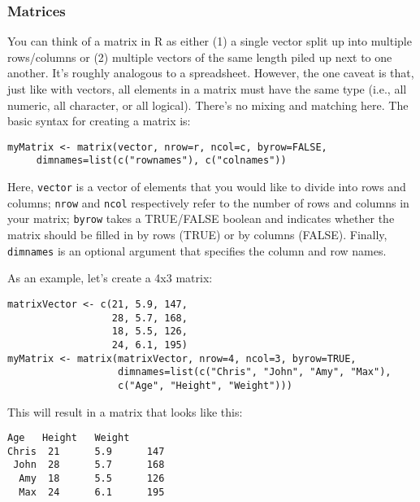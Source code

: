 \subsubsection{Matrices}
You can think of a matrix in R as either (1) a single vector split up into multiple rows/columns or (2) multiple vectors of the same length piled up next to one another. It's roughly analogous to a spreadsheet. However, the one caveat is that, just like with vectors, all elements in a matrix must have the same type (i.e., all numeric, all character, or all logical). There's no mixing and matching here. The basic syntax for creating a matrix is:

\begin{framed}
\begin{Verbatim}[samepage=TRUE]
myMatrix <- matrix(vector, nrow=r, ncol=c, byrow=FALSE, 
     dimnames=list(c("rownames"), c("colnames"))
\end{Verbatim}
\end{framed}

Here, \verb|vector| is a vector of elements that you would like to divide into rows and columns; \verb|nrow| and \verb|ncol| respectively refer to the number of rows and columns in your matrix; \verb|byrow| takes a TRUE/FALSE boolean and indicates whether the matrix should be filled in by rows (TRUE) or by columns (FALSE). Finally, \verb|dimnames| is an optional argument that specifies the column and row names.

As an example, let's create a 4x3 matrix:

\begin{framed}
\begin{Verbatim}[samepage=TRUE]
matrixVector <- c(21, 5.9, 147,
                  28, 5.7, 168,
                  18, 5.5, 126,
                  24, 6.1, 195)
myMatrix <- matrix(matrixVector, nrow=4, ncol=3, byrow=TRUE,
                   dimnames=list(c("Chris", "John", "Amy", "Max"),
                   c("Age", "Height", "Weight")))
\end{Verbatim}
\end{framed}

This will result in a matrix that looks like this:

\begin{framed}
\begin{Verbatim}[samepage=TRUE]
      Age   Height   Weight
Chris  21      5.9      147
 John  28      5.7      168
  Amy  18      5.5      126
  Max  24      6.1      195
\end{Verbatim}
\end{framed}


